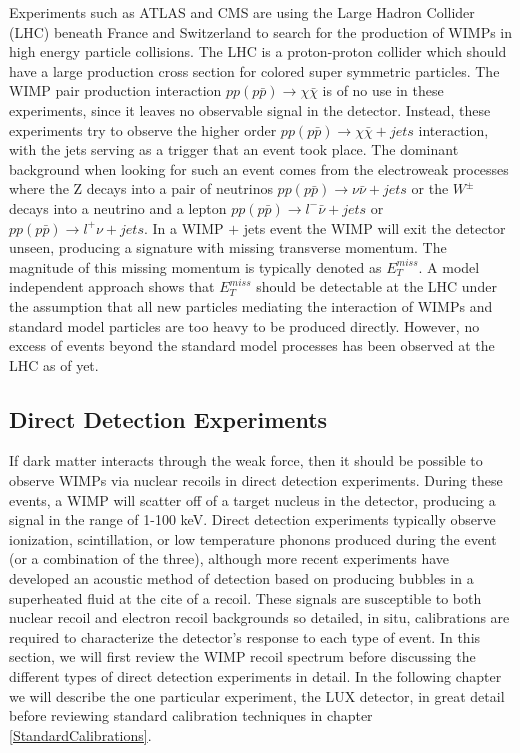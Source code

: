 \documentclass[a4paper,12pt]{article}
\begin{document}
Experiments such as ATLAS and CMS are using the Large Hadron Collider (LHC) beneath France and Switzerland to search for the production of WIMPs in high energy particle collisions.  The LHC is a proton-proton collider which should have a large production cross section for colored super symmetric particles.  The WIMP pair production interaction $pp (p\bar{p}) \rightarrow \chi \bar{\chi}$ is of no use in these experiments, since it leaves no observable signal in the detector.  Instead, these experiments try to observe the higher order $pp (p\bar{p}) \rightarrow \chi \bar{\chi} + jets$ interaction, with the jets serving as a trigger that an event took place.  The dominant background when looking for such an event comes from the electroweak processes where the Z decays into a pair of neutrinos $pp (p\bar{p}) \rightarrow \nu \bar{\nu} + jets$ or the $W^{\pm}$ decays into a neutrino and a lepton $pp (p\bar{p}) \rightarrow l^{-}\bar{\nu} + jets$ or $pp (p\bar{p}) \rightarrow l^{+}\nu + jets$. In a WIMP $+$ jets event the WIMP will exit the detector unseen, producing a signature with missing transverse momentum.  The magnitude of this missing momentum is typically denoted as $E_T^{miss}$.  A model independent approach shows that $E_T^{miss}$ should be detectable at the LHC under the assumption that all new particles mediating the interaction of WIMPs and standard model particles are too heavy to be produced directly.  \cite{Beltran} However, no excess of events beyond the standard model processes has been observed at the LHC as of yet.  \cite{ATLAS}


\subsection{Direct Detection Experiments}
If dark matter interacts through the weak force, then it should be possible to observe WIMPs via nuclear recoils in direct detection experiments. During these events, a WIMP will scatter off of a target nucleus in the detector, producing a signal in the range of 1-100 keV. \cite{Lewin}   Direct detection experiments typically observe ionization, scintillation, or low temperature phonons produced during the event (or a combination of the three), although more recent experiments have developed an acoustic method of detection based on producing bubbles in a superheated fluid at the cite of a recoil.  These signals are susceptible to both nuclear recoil and electron recoil backgrounds so detailed, in situ, calibrations are required to characterize the detector's response to each type of event.  In this section, we will first review the WIMP recoil spectrum before discussing the different types of direct detection experiments in detail.  In the following chapter we will describe the one particular experiment, the LUX detector, in great detail before reviewing standard calibration techniques in chapter \ref{StandardCalibrations}.
\end{document}
